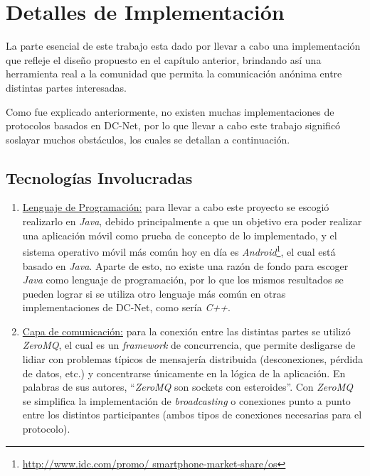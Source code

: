 \chapter{Detalles de Implementación}\label{cap4}

La parte esencial de este trabajo esta dado por llevar a cabo una 
implementación que refleje el diseño propuesto en el capítulo anterior, 
brindando así una herramienta real a la comunidad que permita la comunicación 
anónima entre distintas partes interesadas.

Como fue explicado anteriormente, no existen muchas implementaciones de 
protocolos basados en DC-Net, por lo que llevar a cabo este trabajo significó 
soslayar muchos obstáculos, los cuales se detallan a continuación.

\section{Tecnologías Involucradas}

\begin{enumerate}
    \item \underline{Lenguaje de Programación:} para llevar a cabo este 
    proyecto se escogió realizarlo en \emph{Java}, debido principalmente a que 
    un objetivo era poder realizar una aplicación móvil como prueba de 
    concepto de lo implementado, y el sistema operativo móvil más común hoy en 
    día es \emph{Android}\footnote{\url{http://www.idc.com/promo/
    smartphone-market-share/os}}, el 
    cual está basado en \emph{Java}. Aparte de esto, no existe una razón de 
    fondo para escoger \emph{Java} como lenguaje de programación, por lo que 
    los mismos resultados se pueden lograr si se utiliza otro 
    lenguaje más común en otras implementaciones de DC-Net, como sería 
    \emph{C++}.

    \item \underline{Capa de comunicación:} para la conexión entre las 
    distintas partes se utilizó \emph{ZeroMQ}, el cual es un \emph{framework} 
    de concurrencia, que permite desligarse de lidiar con problemas típicos de 
    mensajería distribuida (desconexiones, pérdida de datos, etc.) y 
    concentrarse únicamente en la lógica de la aplicación. En palabras de sus 
    autores, ``\emph{ZeroMQ} son sockets con esteroides''. Con \emph{ZeroMQ} 
    se simplifica la implementación de \emph{broadcasting} o conexiones punto 
    a punto entre los distintos participantes (ambos tipos de conexiones 
    necesarias para el protocolo).
\end{enumerate}

